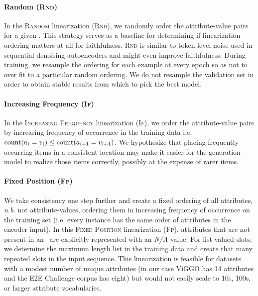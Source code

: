 \paragraph{Random (\textsc{Rnd})} In the \textsc{Random} linearization (\textsc{Rnd}), we randomly
order the attribute-value pairs for a given \meaningrepresentation. This strategy 
serves as a baseline for determining
if linearization ordering matters at all for faithfulness. \textsc{Rnd} 
is similar to token level noise used in
sequential denoising autoencoders \citep{wang2019denoising} and might even improve faithfulness.
During training, we resample the ordering for each example at every epoch
so as not to over fit to a particular random ordering.
We do not resample the validation set in order to obtain stable results 
from which to pick the best model.



\paragraph{Increasing Frequency (\textsc{If})} 
In the \textsc{Increasing Frequency} linearization (\textsc{If}), 
we order the attribute-value pairs by increasing frequency of 
occurrence in the training data
i.e. $\operatorname{count}(a_i=v_i) \le \operatorname{count}(a_{i+1}=v_{i+1})$.
We hypothesize that placing frequently occurring items in a consistent location
may make it easier for the generation model to realize those items correctly, possibly
at the expense of rarer items.

\paragraph{Fixed Position (\textsc{Fp})} We take  consistency one step further 
and create a fixed ordering of all attributes, \textit{n.b.} not attribute-values, ordering them in increasing
frequency of occurrence on the training set (i.e. every instance has the same
order of attributes in the encoder input). In this \textsc{Fixed Position}
linearization (\textsc{Fp}), attributes that are not present 
in an \meaningrepresentation~are explicitly represented with an \textit{N/A} value. 
For list-valued slots, we determine the maximum length list in the training
data and create that many repeated slots in the input sequence.
This linearization is feasible for datasets with a modest number of 
unique attributes (in our case ViGGO has 14 attributes and
the E2E Challenge corpus has eight) but would not easily scale to 10s, 100s, or larger
attribute vocabularies. 





